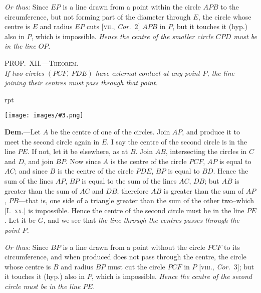 \documentclass[oneside]{book}
\newcounter{wrapwidth}
\newcommand\myprop[2]{
\bigskip\Needspace*{4\baselineskip}\begin{center}\textsc{#1}\\\medskip\emph{#2}\par\end{center}
}
\newcommand\imgflow[3]{
\setcounter{wrapwidth}{#1}
\begin{wrapfigure}[#2]{r}{\value{wrapwidth}pt}
\begin{center}
\vspace{-0.3in}
\texttt{[image: images/\#3.png]}
\end{center}
\end{wrapfigure}
}
\begin{document}
\textit{Or thus:} Since $EP$ is a line drawn from a point
within the circle $APB$ to the circumference, but not
forming part of the diameter through $E$, the circle
whose centre is $E$ and radius $EP$ cuts [\textsc{vii.}, \textit{Cor.}~2]
$APB$ in $P$, but it touches it (hyp.) also in $P$, which is
impossible. \textit{Hence the centre of the smaller circle $CPD$
must be in the line $OP$}.

\myprop{PROP\@.~XII\@.---Theorem.}{If two circles $(PCF,\ PDE)$ have external contact at any
point $P$, the line joining their centres must pass through
that point.}

\imgflow{150}{7}{f115}

\textbf{Dem.}---Let $A$ be the centre of one of the circles.
Join $AP$, and produce it to meet the second circle again
in $E$. I say the centre of the second circle is in the
line $PE$. If not, let it be elsewhere, as at $B$. Join
$AB$, intersecting the circles
in $C$ and $D$, and join $BP$.
Now since $A$ is the centre
of the circle $PCF$, $AP$ is
equal to $AC$; and since $B$
is the centre of the circle
$PDE$, $BP$ is equal to $BD$.
Hence the sum of the lines $AP$, $BP$ is equal to the
sum of the lines $AC$, $DB$; but $AB$ is greater than the
sum of $AC$ and $DB$; therefore $AB$ is greater than the
sum of $AP$, $PB$---that is, one side of a triangle greater
than the sum of the other two--which [I.~\textsc{xx.}] is impossible.
Hence the centre of the second circle must be
in the line $PE$. Let it be $G$, and we see that \textit{the line
through the centres passes through the point $P$.}

\textit{Or thus:} Since $BP$ is a line drawn from a point without
the circle $PCF$ to its circumference, and when produced
does not pass through the centre, the circle
whose centre is $B$ and radius $BP$ must cut the circle
$PCF$ in $P$ [\textsc{viii.}, \textit{Cor.}~3]; but it touches it (hyp.) also
in $P$, which is impossible. \textit{Hence the centre of the
second circle must be in the line $PE$.}\par\medskip
\end{document}
